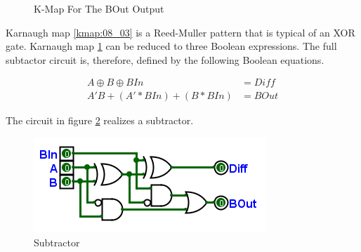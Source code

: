 \begin{figure}[H]
	\caption{K-Map For The BOut Output}
	\label{kmap:08_04}
\end{figure}

Karnaugh map \ref{kmap:08_03} is a Reed-Muller pattern that is typical of an \textsf{XOR} gate. Karnaugh map \ref{kmap:08_04} can be reduced to three Boolean expressions. The full subtactor circuit is, therefore, defined by the following Boolean equations. 

\begin{align}
	\label{CL:eq:subtractor}
	A \oplus B \oplus BIn &= Diff \\
	\nonumber
	A'B + (A' * BIn) + (B * BIn) &= BOut
\end{align}

The circuit in figure \ref{fig:08_09} realizes a subtractor.

\begin{figure}[H]
	\centering
	\includegraphics[width=\maxwidth{.95\linewidth}]{gfx/08_09}
	\caption{Subtractor}
	\label{fig:08_09}
\end{figure}


